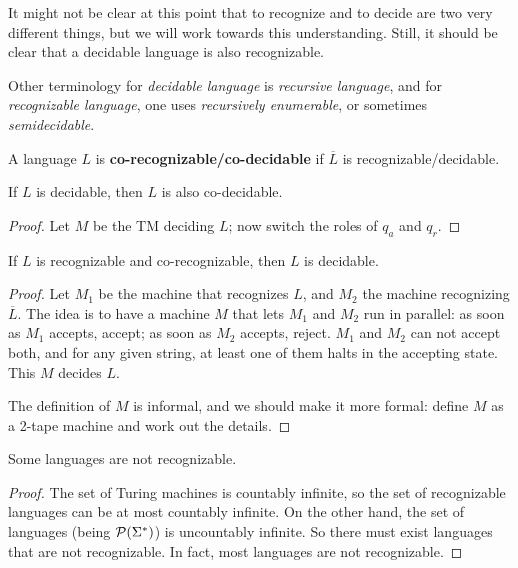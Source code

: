 It might not be clear at this point that to recognize and to decide
are two very different things, but we will work towards this
understanding. Still, it should be clear that a decidable language is
also recognizable.

Other terminology for {\em decidable language} is {\em recursive
  language}, and for {\em recognizable language}, one uses {\em
  recursively enumerable}, or sometimes {\em semidecidable}.

\begin{definition}
A language $L$ is \textbf{co-recognizable/co-decidable} if $\overline{L}$
is recognizable/decidable.
\end{definition}

\begin{theorem} \label{corecognizable}
If $L$ is decidable, then $L$ is also co-decidable.
\end{theorem}
\begin{proof}
Let $M$ be the TM deciding $L$; now switch the roles of $q_a$ and $q_r$.
\end{proof}

\begin{theorem} \label{isdec}
If $L$ is recognizable and co-recognizable, then $L$ is decidable.
\end{theorem}
\begin{proof}
Let $M_1$ be the machine that recognizes $L$, and $M_2$ the machine
recognizing $\overline{L}$. The idea is to have a machine $M$ that
lets $M_1$ and $M_2$ run in parallel: as soon as $M_1$ accepts, accept; as soon
as $M_2$ accepts, reject. $M_1$ and $M_2$ can not accept both, and for any
given string, at least one of them halts in the accepting state. This
$M$ decides $L$.

The definition of $M$ is informal, and we should make it more formal:
define $M$ as a 2-tape machine and work out the details.
\end{proof}

\begin{theorem}
Some languages are not recognizable.
\end{theorem}
\begin{proof}
The set of Turing machines is countably infinite, so the set of
recognizable languages can be at most countably infinite. On the other
hand, the set of languages (being ${\cal P}(\Sigma^*)$) is uncountably
infinite. So there must exist languages that are not recognizable.
In fact, most languages are not recognizable.
\end{proof}


